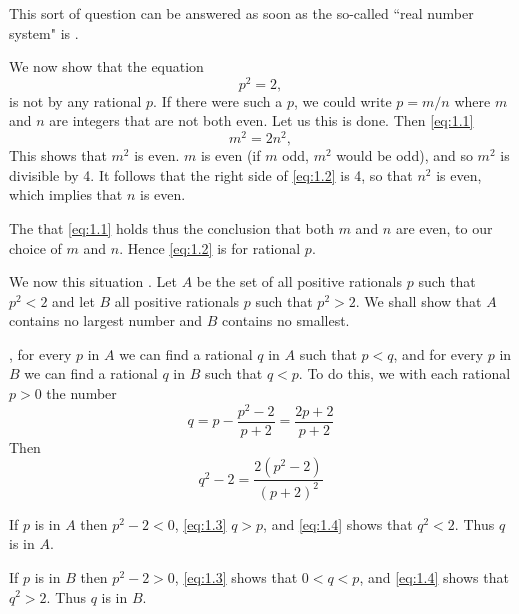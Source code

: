 This sort of question can be answered as soon as the so-called ``real number system" is .
\begin{theorem}
  We now show that the equation
  \begin{equation}\label{eq:1.1}
    p^2 = 2,
  \end{equation}
  is not  by any rational $p$. If there were such a $p$, we could write $p=m / n$ where $m$ and $n$ are integers that are not both even. Let us  this is done. Then \eqref{eq:1.1} 
  \begin{equation}\label{eq:1.2}
    m^2 = 2n^2,
  \end{equation}
  This shows that $m^2$ is even.  $m$ is even (if $m$  odd, $m^2$ would be odd), and so $m^2$ is divisible by 4. It follows that the right side of \eqref{eq:1.2} is  4, so that $n^2$ is even, which implies that $n$ is even.

  The  that \eqref{eq:1.1} holds thus  the conclusion that both $m$ and $n$ are even,  to our choice of $m$ and $n$. Hence \eqref{eq:1.2} is  for rational $p$.

  We now  this situation . Let $A$ be the set of all positive rationals $p$ such that $p^2<2$ and let $B$  all positive rationals $p$ such that $p^2>2$. We shall show that $A$ contains no largest number and $B$ contains no smallest.

  , for every $p$ in $A$ we can find a rational $q$ in $A$ such that $p<q$, and for every $p$ in $B$ we can find a rational $q$ in $B$ such that $q<p$. To do this, we  with each rational $p>0$ the number
  \begin{equation}\label{eq:1.3}
    q=p-\frac{p^2-2}{p+2}=\frac{2 p+2}{p+2}
  \end{equation}
  Then
  \begin{equation}\label{eq:1.4}
    q^2-2=\frac{2\left(p^2-2\right)}{(p+2)^2}
  \end{equation}
  
  If $p$ is in $A$ then $p^2-2<0$, \eqref{eq:1.3}  $q>p$, and \eqref{eq:1.4} shows that $q^2<2$. Thus $q$ is in $A$.

  If $p$ is in $B$ then $p^2-2>0$, \eqref{eq:1.3} shows that $0<q<p$, and \eqref{eq:1.4} shows that $q^2>2$. Thus $q$ is in $B$.
\end{theorem}

